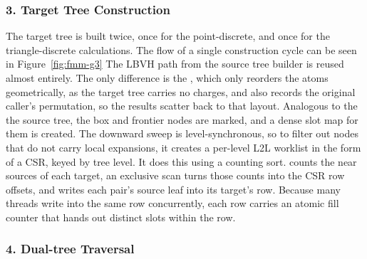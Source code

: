 

\subsubsection{3. Target Tree Construction}

The target tree is built twice, once for the point-discrete, and once for the triangle-discrete calculations.
The flow of a single construction cycle can be seen in Figure~\ref{fig:fmm-g3}
The LBVH path from the source tree builder is reused almost entirely.
The only difference is the , which only reorders the atoms geometrically, as the target tree carries no charges, and also records the original caller's permutation, so the results scatter back to that layout.
Analogous to the the source tree, the box and frontier nodes are marked, and a dense slot map for them is created.
The downward sweep is level-synchronous, so to filter out nodes that do not carry local expansions, it creates a per-level L2L worklist in the form of a CSR, keyed by tree level.
It does this using a counting sort.
 counts the near sources of each target, an exclusive scan turns those counts into the CSR row offsets, and  writes each pair's source leaf into its target's row.
Because many threads write into the same row concurrently, each row carries an atomic fill counter that hands out distinct slots within the row.



\subsubsection{4. Dual-tree Traversal}

